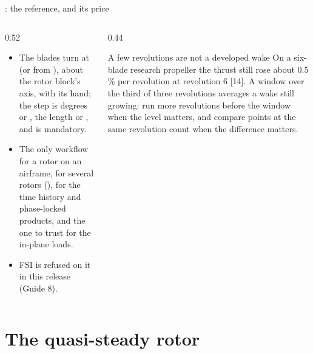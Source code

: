 \begin{frame}{: the reference, and its price}
\begin{columns}[T]
\begin{column}{0.52\textwidth}
\begin{itemize}\small
  \item The blades turn at  (or from ), about
        the rotor block's axis, with its hand; the step is 
        degrees or , the length  or
        , and  is mandatory.
  \item The only workflow for a rotor on an airframe, for several rotors
        (), for the time history and phase-locked products, and
        the one to trust for the in-plane loads.
  \item FSI is refused on it in this release (Guide 8).
\end{itemize}
\end{column}
\begin{column}{0.44\textwidth}
\begin{alertblock}{A few revolutions are not a developed wake}
\small On a six-blade research propeller the thrust still rose about
0.5\,\% per revolution at revolution 6 [14]. A window over the third of three
revolutions averages a wake still growing: run more revolutions before the
window when the level matters, and compare points at the same revolution
count when the difference matters.
\end{alertblock}
\end{column}
\end{columns}
\end{frame}

\section{The quasi-steady rotor}

